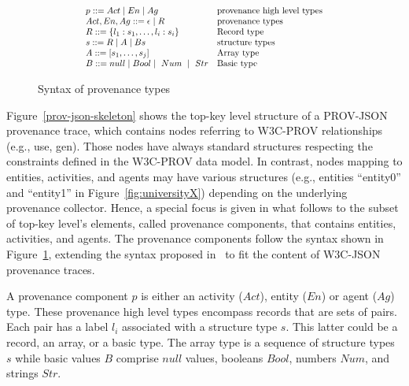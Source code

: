 \begin{figure}[b]
\[  \scalemath{0.8}{
\begin{array}{lllllll}
p ::=  Act \mid En \mid Ag  & \text{provenance high level types} \\
Act,En,Ag ::=  \epsilon \mid R  & \text{provenance types} \\
R ::=	\{ l_1:s_1, \ldots, l_i:s_i \}    & \text{Record type} \\
s::=    R \mid A \mid Bs  & \text{structure types} \\
A ::=  [s_1, \ldots,s_j]&\text{Array type} \\
B ::=	 \nule \mid Bool \mid \ Num \  \mid \ Str  & \text{Basic type}\\
\end{array} }
\]
 \vspace{-1.5em}
\caption{Syntax of provenance types}
\label{fig:datamodel}
\end{figure}





Figure~\ref{prov-json-skeleton} shows the top-key level structure of a PROV-JSON provenance trace, which contains nodes referring to W3C-PROV relationships (e.g., use, gen). Those nodes have always standard structures respecting the constraints defined in the W3C-PROV data model. In contrast, nodes mapping to entities, activities, and agents may have various structures (e.g., entities ``entity0'' and ``entity1'' in Figure~\ref{fig:universityX}) depending  on the underlying provenance collector.
Hence, a special focus is given in what follows to the subset of top-key level's elements, called provenance components, that contains entities, activities, and agents.
The provenance components follow the syntax shown in Figure~\ref{fig:datamodel}, extending the syntax proposed in~\cite{baazizi2017} to fit the content of W3C-JSON provenance traces. 



A provenance component $p$ is either an activity ($Act$), entity ($En$) or agent ($Ag$) type. 
These provenance high level types encompass records that are sets of pairs. Each pair has a label $l_i$ associated with a structure type $s$.
This latter could be a record, an array, or a basic type.
The array type is a sequence of structure types $s$ while basic values $B$ comprise $null$ values, booleans $Bool$, numbers $Num$, and strings $Str$.





